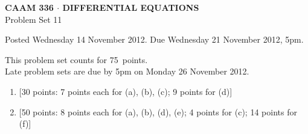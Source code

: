 \documentclass[10pt]{article}
\begin{document}
\begin{center}
\large \textsf{\textbf{CAAM 336 $\cdot$ DIFFERENTIAL EQUATIONS}\\[0.5em]
 Problem Set 11 }
\end{center}

Posted Wednesday 14 November 2012.  Due Wednesday 21 November 2012, 5pm.

\begin{center}
This problem set counts for 75~points.\\
{Late problem sets are due by 5pm on Monday 26 November 2012.}
\end{center}


\begin{enumerate}
\item {[30 points: 7 points each for (a), (b), (c); 9 points for (d)]}\\  

\item {[50 points: 8 points each for (a), (b), (d), (e); 4 points for (c); 14 points for (f)]}\\  





\end{enumerate}
\end{document}
